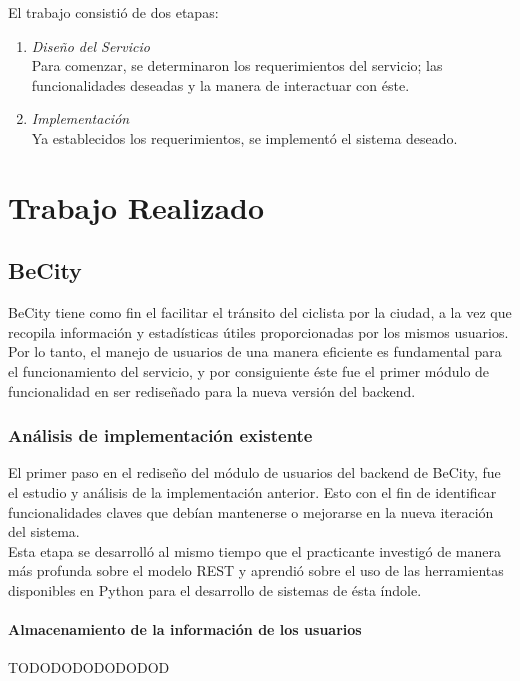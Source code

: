 \documentclass[11pt,letterpaper]{article}
\begin{document}
El trabajo consistió de dos etapas:
\begin{enumerate}
    \item \emph{Diseño del Servicio}\\ Para comenzar, se determinaron los requerimientos del servicio; las funcionalidades deseadas y la manera de interactuar con éste.
    \item \emph{Implementación}\\ Ya establecidos los requerimientos, se implementó el sistema deseado.
\end{enumerate}

\newpage
\section{Trabajo Realizado}

\subsection{BeCity}

BeCity tiene como fin el facilitar el tránsito del ciclista por la ciudad, a la vez que recopila información y estadísticas útiles proporcionadas por los mismos usuarios. Por lo tanto, el manejo de usuarios de una manera eficiente es fundamental para el funcionamiento del servicio, y por consiguiente éste fue el primer módulo de funcionalidad en ser rediseñado para la nueva versión del backend.

\subsubsection{Análisis de implementación existente}

El primer paso en el rediseño del módulo de usuarios del backend de BeCity, fue el estudio y análisis de la implementación anterior. Esto con el fin de identificar funcionalidades claves que debían mantenerse o mejorarse en la nueva iteración del sistema.\\
Esta etapa se desarrolló al mismo tiempo que el practicante investigó de manera más profunda sobre el modelo REST y aprendió sobre el uso de las herramientas disponibles en Python para el desarrollo de sistemas de ésta índole.

\paragraph{Almacenamiento de la información de los usuarios}
TODODODODODODOD
\end{document}
